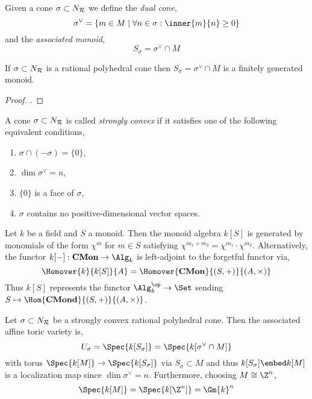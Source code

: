 \begin{defn}
Given a cone $\sigma \subset N_{\mathcal{R}}$ we define the \textit{dual cone},
\[ \sigma^\vee = \{ m \in M \mid \forall n \in \sigma : \inner{m}{n} \ge 0 \} \]
and the \textit{associated monoid},
\[ S_\sigma = \sigma^\vee \cap M \]
\end{defn}

\begin{lemma}[Gordan]
If $\sigma \subset N_{\mathcal{R}}$ is a rational polyhedral cone then $S_\sigma = \sigma^\vee \cap M$ is a finitely generated monoid. 
\end{lemma}

\begin{proof}
\cite[Prop. 1.2.17]{cox}.
\end{proof}

\begin{defn}
A cone $\sigma \subset N_{\mathcal{R}}$ is called \textit{strongly convex} if it satisfies one of the following equivalent conditions,
\begin{enumerate}
\item $\sigma \cap (-\sigma) = \{ 0 \}$,
\item $\dim{\sigma^\vee} = n$,
\item $\{ 0 \}$ is a face of $\sigma$,
\item $\sigma$ contains no positive-dimensional vector spaces.
\end{enumerate}
\end{defn}

\begin{defn}
Let $k$ be a field and $S$ a monoid. Then the monoid algebra $k[S]$ is generated by monomials of the form $\chi^m$ for $m \in S$ satisfying $\chi^{m_1 + m_2} = \chi^{m_1} \cdot \chi^{m_2}$. 
Alternatively, the functor $k[-] : \mathbf{CMon} \to \Alg_k$ is left-adjoint to the forgetful functor via,
\[ \Homover{k}{k[S]}{A} = \Homover{\mathbf{CMon}}{(S, +)}{(A, \times)} \]
Thus $k[S]$ represents the functor $\Alg_k^\op \to \Set$ sending $S \mapsto \Hom{\mathbf{CMond}}{(S, +)}{(A, \times)}$.
\end{defn}

\begin{defn}
Let $\sigma \subset N_{\mathcal{R}}$ be a strongly convex rational polyhedral cone. Then the associated affine toric variety is,
\[ U_\sigma = \Spec{k[S_\sigma]} = \Spec{k[\sigma^\vee \cap M]} \]
with torus $\Spec{k[M]} \to \Spec{k[S_\sigma]}$ via $S_\sigma \subset M$ and thus $k[S_\sigma] \embed k[M]$ is a localization map since $\dim{\sigma^\vee} = n$. Furthermore, choosing $M \cong \Z^n$,
\[ \Spec{k[M]} = \Spec{k[\Z^n]} = \Gm{k}^n \]
\end{defn}

